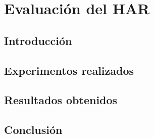 
\chapter{Evaluación del HAR}

\label{chap6:experimentos}

\section{Introducción}

\section{Experimentos realizados}

\section{Resultados obtenidos}

\section{Conclusión}
